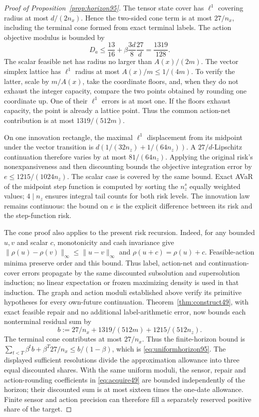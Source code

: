\begin{proof}[Proof of Proposition~\ref{prop:horizon95}]
The tensor state cover has $\ell^1$ covering radius at most $d/(2n_x)$. Hence the two-sided cone term is at most $27/n_x$, including the terminal cone formed from exact terminal labels. The action objective modulus is bounded by
\[
 D_a\leq\frac{13}{16}+\beta\frac{3d}{8}\frac{27}{d}
      =\frac{1319}{128}.
\]
The scalar feasible net has radius no larger than $A(x)/(2m)$. The vector simplex lattice has $\ell^1$ radius at most $A(x)/m\leq1/(4m)$. To verify the latter, scale by $m/A(x)$, take the coordinate floors, and, when they do not exhaust the integer capacity, compare the two points obtained by rounding one coordinate up. One of their $\ell^1$ errors is at most one. If the floors exhaust capacity, the point is already a lattice point. Thus the common action-net contribution is at most $1319/(512m)$.

On one innovation rectangle, the maximal $\ell^1$ displacement from its midpoint under the vector transition is
$d(1/(32n_z)+1/(64n_z))$. A $27/d$-Lipschitz continuation therefore varies by at most $81/(64n_z)$. Applying the original risk's nonexpansiveness and then discounting bounds the objective integration error by $e\leq1215/(1024n_z)$. The scalar case is covered by the same bound. Exact AVaR of the midpoint step function is computed by sorting the $n_z^s$ equally weighted values; $4\mid n_z$ ensures integral tail counts for both risk levels. The innovation law remains continuous: the bound on $e$ is the explicit difference between its risk and the step-function risk.

The cone proof also applies to the present risk recursion. Indeed, for any bounded $u,v$ and scalar $c$, monotonicity and cash invariance give $\|\rho(u)-\rho(v)\|_\infty\leq\|u-v\|_\infty$ and $\rho(u+c)=\rho(u)+c$. Feasible-action minima preserve order and this bound. Thus label, action-net and continuation-cover errors propagate by the same discounted subsolution and supersolution induction; no linear expectation or frozen maximizing density is used in that induction. The graph and action moduli established above verify its primitive hypotheses for every own-future continuation. Theorem~\ref{thm:construct49}, with exact feasible repair and no additional label-arithmetic error, now bounds each nonterminal residual sum by
\[
 b:=27/n_x+1319/(512m)+1215/(512n_z).
\]
The terminal cone contributes at most $27/n_x$. Thus the finite-horizon bound is
$\sum_{t<T}\beta^t b+\beta^T27/n_x\leq b/(1-\beta)$,
which is \eqref{eq:uniformhorizon95}. The displayed sufficient resolutions divide the approximation allowance into three equal discounted shares. With the same uniform moduli, the sensor, repair and action-rounding coefficients in \eqref{eq:acquire49} are bounded independently of the horizon; their discounted sum is at most sixteen times the one-date allowance. Finite sensor and action precision can therefore fill a separately reserved positive share of the target.
\end{proof}

